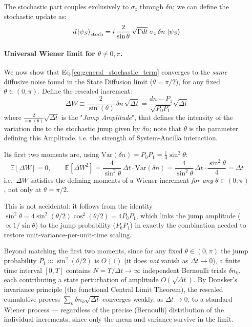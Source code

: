 \documentclass[a4paper,12pt]{article}
\begin{document}
The stochastic part couples exclusively to $\sigma_{z}$ through $\delta n$; we can define the stochastic update as:
\begin{equation}
	d\ket{\psi_{S}}_{\text{stoch}} = i\,\frac{2}{\sin\theta}\,\sqrt{\Gamma dt}\;\sigma_{z}\,\delta n \,\ket{\psi_{S}}
	\label{eq:general_stochastic_term}
\end{equation}

\paragraph{Universal Wiener limit for $\theta \neq 0,\pi$.}
We now show that Eq.\ref{eq:general_stochastic_term} converges to the \emph{same} 
diffusive noise found in the State Diffusion limit ($\theta=\pi/2$), for any fixed 
$\theta \in (0,\pi)$. Define the rescaled increment:
\begin{equation}
	\Delta W \equiv \frac{2}{\sin (\theta)}\,\delta n\,\sqrt{\Delta t}
	\label{eq:general_dW_definition} = \frac{dn - P_{1}}{\sqrt{P_{0}P_{1}}} \sqrt{\Delta t}
\end{equation}
where $ \frac{2}{\sin (\theta)} \sqrt{\Delta t} $ is the "\textit{Jump Amplitude}", that defines the intensity of the variation due to the stochastic jump given by $  \delta n $; note that $ \theta $ is the parameter defining this Amplitude, i.e. the strength of System-Ancilla interaction.

Its first two moments are, using $\text{Var}(\delta n)=P_0P_1=\tfrac{1}{4}\sin^2\theta$:
\begin{equation}
	\mathbb{E}[\Delta W] = 0, \qquad 
	\mathbb{E}[\Delta W^{2}] = \frac{4}{\sin^{2}\theta}\,\Delta t \cdot \text{Var}(\delta n) 
	= \frac{4}{\sin^{2}\theta}\,\Delta t \cdot \frac{\sin^{2}\theta}{4} = \Delta t
	\label{eq:general_dW_moments}
\end{equation}
i.e.\ $\Delta W$ satisfies the defining moments of a Wiener increment \emph{for any} 
$\theta \in (0,\pi)$, not only at $\theta=\pi/2$.

This is not accidental: it follows 
from the identity $\sin^{2}\theta = 4\sin^{2}(\theta/2)\cos^{2}(\theta/2)=4P_0P_1$, which 
links the jump amplitude ($\propto 1/\sin\theta$) to the jump probability ($P_0P_1$) in 
exactly the combination needed to restore unit-variance-per-unit-time scaling.

Beyond matching the first two moments, since for any fixed $\theta\in(0,\pi)$ the 
jump probability $P_{1}\approx\sin^{2}(\theta/2)$ is $O(1)$ (it does \emph{not} vanish 
as $\Delta t\to0$), a finite time interval $[0,T]$ contains $N=T/\Delta t \to \infty$ 
independent Bernoulli trials $\delta n_{k}$, each contributing a state perturbation of 
amplitude $O(\sqrt{\Delta t})$. By Donsker's invariance principle (the functional 
Central Limit Theorem), the rescaled cumulative process 
$\sum_{k} \delta n_{k}\sqrt{\Delta t}$ converges weakly, as $\Delta t \to 0$, to a 
standard Wiener process — regardless of the precise (Bernoulli) distribution of the 
individual increments, since only the mean and variance survive in the limit. 
\end{document}

